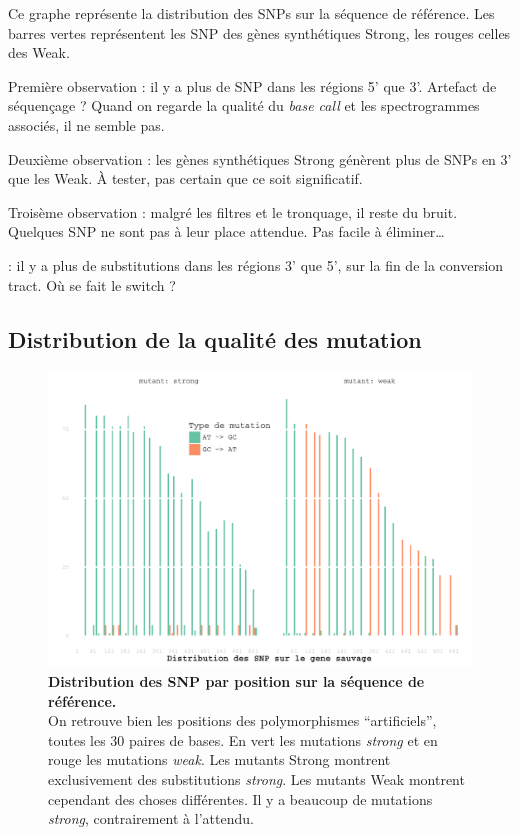 \documentclass[a4paper]{tufte-handout}
\begin{document}
Ce graphe représente la distribution des SNPs sur la séquence de référence. Les
barres vertes représentent les SNP des gènes synthétiques Strong, les rouges
celles des Weak. 

Première observation : il y a plus de SNP dans les régions 5' que 3'. Artefact
de séquençage ? Quand on regarde la qualité du \emph{base call} et les spectrogrammes
associés, il ne semble pas. 

Deuxième observation : les gènes synthétiques Strong génèrent plus de SNPs en 3'
que les Weak. À tester, pas certain que ce soit significatif. 

Troisème observation : malgré les filtres et le tronquage, il reste du bruit.
Quelques SNP ne sont pas à leur place attendue. Pas facile à éliminer…

 : il y a plus de substitutions dans les régions 3' que 5',
sur la fin de la conversion tract. Où se fait le switch ? 


\newpage
\subsection{Distribution de la qualité des mutation}
\label{sec:orgheadline7}

\begin{figure}[h]
  \centering
  \includegraphics[width=\linewidth]{../substitution_distribution.pdf}
  \caption{\textbf{Distribution des SNP par position sur la séquence de référence.} \\
  On retrouve bien les positions des polymorphismes ``artificiels'', toutes les
  $30$ paires de bases. En vert les mutations \emph{strong} et en rouge les
  mutations \emph{weak}. Les mutants Strong montrent exclusivement des
  substitutions \emph{strong}. Les mutants Weak montrent cependant des
  choses différentes. Il y a beaucoup de mutations \emph{strong}, contrairement
  à l'attendu. 
  }
  \label{figure2}
\end{figure}
\end{document}
